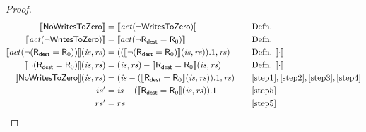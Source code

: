 \documentclass[12pt, letterpaper]{article}
\newcommand\interp[1]{\llbracket #1 \rrbracket}
\begin{document}
\begin{proof}
 \par\nobreak
 {\fontsize{10pt}{12pt}\selectfont
   \hfill \\
   \begin{alignat}{2}
     \setcounter{equation}{0}
     \label{step1}
     \interp{\mathsf{NoWritesToZero}}
     &= \interp{\mathit{act}(\neg \mathsf{WritesToZero})}
     &&\quad \text{Defn.}\\
     \label{step2}
     \interp{\mathit{act}(\neg \mathsf{WritesToZero})}
     &= \interp{act(\neg \mathsf{R}_{\mathsf{dest}} = \mathsf{R}_0)}
     &&\quad \text{Defn.}\\
     \label{step3}
     \interp{act(\neg(\mathsf{R}_{\mathsf{dest}} = \mathsf{R}_0))}(\mathit{is},\mathit{rs})
     &= ((\interp{\neg(\mathsf{R}_{\mathsf{dest}} = \mathsf{R}_0)}(\mathit{is},\mathit{rs})).1, \mathit{rs})
     &&\quad \text{Defn.}\ \interp{\cdot}\\    
     \label{step4}
     \interp{\neg(\mathsf{R}_{\mathsf{dest}} = \mathsf{R}_0)}(\mathit{is},\mathit{rs})
     &= (\mathit{is},\mathit{rs}) - \interp{\mathsf{R}_{\mathsf{dest}} = \mathsf{R}_0}(\mathit{is},\mathit{rs})
     &&\quad \text{Defn.}\ \interp{\cdot}\\    
     \label{step5}
     \interp{\mathsf{NoWritesToZero}}(\mathit{is},\mathit{rs})
     &= (\mathit{is} - (\interp{\mathsf{R}_{\mathsf{dest}} = \mathsf{R}_0}(\mathit{is},\mathit{rs})).1, \mathit{rs})
     &&\quad \ref{step1},\ref{step2},\ref{step3},\ref{step4}\\
     \label{step6}
     is' &= \mathit{is} - (\interp{\mathsf{R}_{\mathsf{dest}} = \mathsf{R}_0}(\mathit{is},\mathit{rs})).1
     &&\quad \ref{step5} \\
     \label{step7}
     rs' &= rs 
     &&\quad \ref{step5}
   \end{alignat}
 }%
 \end{proof}
 
\end{document}
